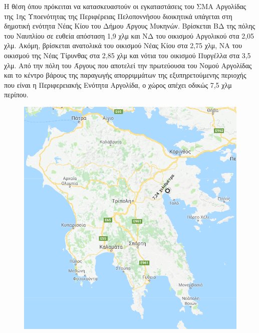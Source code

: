 \documentclass[12pt]{article}
\begin{document}
	Η θέση όπου πρόκειται να κατασκευαστούν οι εγκαταστάσεις του ΣΜΑ Αργολίδας της  1ης  Υποενότητας της Περιφέρειας Πελοποννήσου διοικητικά υπάγεται στη δημοτική ενότητα Νέας Κίου του Δήμου Άργους Μυκηνών. Βρίσκεται ΒΔ της πόλης του Ναυπλίου σε ευθεία απόσταση 1,9 χλμ και ΝΔ του οικισμού Αργολικού στα 2,05 χλμ. Ακόμη, βρίσκεται ανατολικά του οικισμού Νέας Κίου στα 2,75 χλμ, ΝΑ του οικισμού της Νέας Τίρυνθας στα 2,85 χλμ και νότια του οικισμού Πυργέλλα στα 3,5 χλμ. Από την πόλη του Άργους που αποτελεί την πρωτεύουσα του Νομού Αργολίδας και το κέντρο βάρους της παραγωγής απορριμμάτων της εξυπηρετούμενης περιοχής που είναι η Περιφερειακής Ενότητα Αργολίδα, ο χώρος απέχει οδικώς 7,5 χλμ περίπου.

	\begin{figure} [H]
		\begin{center}
			\includegraphics [scale = 0.55] {map13.png}
		\end{center}
	\end{figure}
\end{document}
